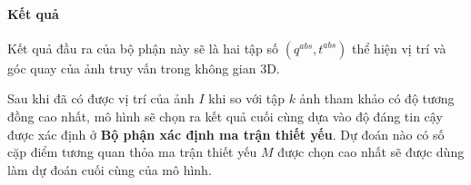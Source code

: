 \paragraph*{Kết quả}

Kết quả đầu ra của bộ phận này sẽ là hai tập số $(q^{abs},t^{abs})$ thể hiện vị trí và góc quay của ảnh truy vấn trong không gian 3D.

Sau khi đã có được vị trí của ảnh $I$ khi so với tập $k$ ảnh tham khảo có độ tương đồng cao nhất, mô hình sẽ chọn ra kết quả cuối cùng dựa vào độ đáng tin cậy được xác định ở \textbf{Bộ phận xác định ma trận thiết yếu}. Dự đoán nào có số cặp điểm tương quan thỏa ma trận thiết yếu $M$ được chọn cao nhất sẽ được dùng làm dự đoán cuối cùng của mô hình.